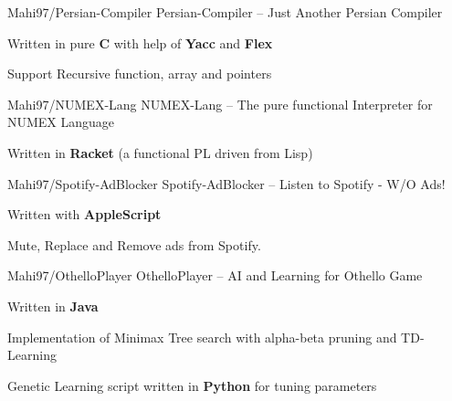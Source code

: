 
\begin{cventries}
  \cventry
    {Mahi97/Persian-Compiler} %
    {Persian-Compiler -- Just Another Persian Compiler} %
    {} %
    {} %
    {
      \begin{cvitems} %
        \item {Written in pure \textbf{C} with help of \textbf{Yacc} and \textbf{Flex}}
        \item {Support Recursive function, array and pointers}
      \end{cvitems}
    }
        \newline

  \cventry
    {Mahi97/NUMEX-Lang} %
    {NUMEX-Lang -- The pure functional Interpreter for NUMEX Language} %
    {} %
    {} %
    {
      \begin{cvitems} %
        \item {Written in \textbf{Racket} (a functional PL driven from Lisp)}
      \end{cvitems}
    }
        \newline

  \cventry
    {Mahi97/Spotify-AdBlocker} %
    {Spotify-AdBlocker -- Listen to Spotify - W/O Ads!} %
    {} %
    {} %
    {
      \begin{cvitems} %
        \item {Written with \textbf{AppleScript}}
        \item {Mute, Replace and Remove ads from Spotify.}
      \end{cvitems}
    }
    \newline
\cventry
    {Mahi97/OthelloPlayer} %
    {OthelloPlayer -- AI and Learning for Othello Game} %
    {} %
    {} %
    {
      \begin{cvitems} %
        \item {Written in \textbf{Java}}
        \item {Implementation of Minimax Tree search with alpha-beta pruning and TD-Learning}
        \item {Genetic Learning script written in \textbf{Python} for tuning parameters}
      \end{cvitems}
    }


\end{cventries}

